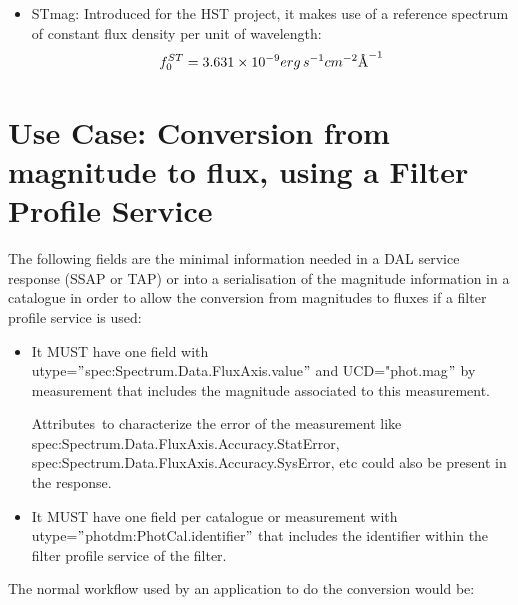 \documentclass[11pt,a4paper]{ivoa}
\newcommand{\angstrom}{\mbox{\normalfont\AA}}
\begin{document}
\begin{itemize}
	\item{STmag: Introduced for the HST project, it makes use of a reference spectrum of
	constant flux density per unit of wavelength:
\begin{equation} \label{eq:32}
f_0^{ST} = 3.631 \times 10^{-9} erg\, s^{-1} cm^{-2} \angstrom ^{-1}
\end{equation}}

\end{itemize}
\section{Use Case: Conversion from magnitude to flux, using a Filter Profile Service}
The following fields are the minimal information needed in a DAL service response (SSAP
or TAP) or into a serialisation of the magnitude information in a catalogue in order to
allow the conversion from magnitudes to fluxes if a filter profile service is used:
\par

\begin{itemize}
	\item{It MUST have one field with\\ utype=$"$spec:Spectrum.Data.FluxAxis.value$"$
	and UCD="phot.mag$"$  by measurement that includes the magnitude associated to
	this measurement. \par}

Attributes\ to characterize the error of the measurement like\\
spec:Spectrum.Data.FluxAxis.Accuracy.StatError,\\
spec:Spectrum.Data.FluxAxis.Accuracy.SysError, etc could also be present
in the response.
\par

	\item{It MUST have one field per catalogue or measurement
	with\\ utype=$"$photdm:PhotCal.identifier$"$  that includes the identifier within the
	filter profile service of the filter.}
\end{itemize}\par

The normal workflow used by an application to do the conversion would be:
\par
\end{document}
